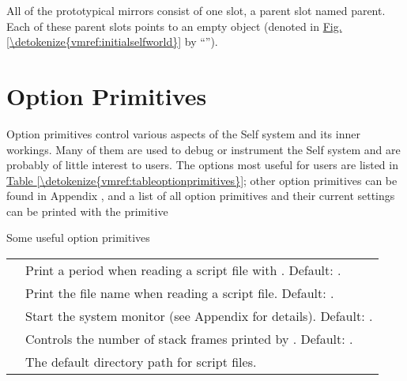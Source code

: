 \documentclass[letterpaper,10pt,english]{sphinxmanual}
\begin{document}
All of the prototypical mirrors consist of one slot, a parent slot named parent. Each of
these parent slots points to an empty object (denoted in \hyperref[\detokenize{vmref:initialselfworld}]{Fig.\@ \ref{\detokenize{vmref:initialselfworld}}} by “\sphinxcode{( )}”).

\newpage

\section{Option Primitives}
\label{\detokenize{vmref:option-primitives}}

Option primitives control various aspects of the Self system and its inner workings. Many of
them are used to debug or instrument the Self system and are probably of little interest to users.
The options most useful for users are listed in \hyperref[\detokenize{vmref:tableoptionprimitives}]{Table \ref{\detokenize{vmref:tableoptionprimitives}}}; other option primitives can be found in Appendix
{\hyperref[\detokenize{primitives:pp-primitives}]{}} {\hyperref[\detokenize{primitives::doc}]{}}, and a list of all option primitives and their current settings can be printed with the
primitive 


\begin{threeparttable}
\capstart\caption{Some useful option primitives}\label{\detokenize{vmref:tableoptionprimitives}}\label{\detokenize{vmref:id11}}
\noindent\begin{tabulary}{\linewidth}{p{5cm} p{10cm}}
\hline
{}\relax &\relax \\
\hline
{}
&
Print a period when reading a script file with . Default: .
\\
\hline
{}
&
Print the file name when reading a script file. Default: .
\\
\hline
{}
&
Start the system monitor (see Appendix {\hyperref[\detokenize{monitor:pp-the-system-monitor}]{}} for details). Default: .
\\
\hline
{}
&
Controls the number of stack frames printed by . Default: .
\\
\hline
{}
&
The default directory path for script files.
\\
\hline\end{tabulary}

\end{threeparttable}
\end{document}
